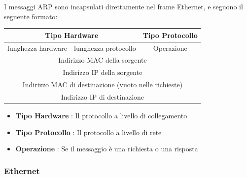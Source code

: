 \documentclass[12pt, letterpaper]{article}
\begin{document}
I messaggi ARP sono incapsulati direttamente nel frame Ethernet, e seguono il seguente formato: \begin{center}
    \begin{tabular}{|ccc|}
        \hline
        \multicolumn{2}{|c|}{Tipo Hardware}                                                  & Tipo Protocollo \\ \hline
        \multicolumn{1}{|c|}{lunghezza hardware} & \multicolumn{1}{c|}{lunghezza protocollo} & Operazione      \\ \hline
        \multicolumn{3}{|c|}{Indirizzo MAC della sorgente}                                                     \\ \hline
        \multicolumn{3}{|c|}{Indirizzo IP della sorgente}                                                      \\ \hline
        \multicolumn{3}{|c|}{Indirizzo MAC di destinazione (vuoto nelle richieste)}                            \\ \hline
        \multicolumn{3}{|c|}{Indirizzo IP di destinazione}                                                     \\ \hline
        \end{tabular}
\end{center}\begin{itemize}
    \item \textbf{Tipo Hardware} : Il protocollo a livello di collegamento
    \item \textbf{Tipo Protocollo} : Il protocollo a livello di rete
    \item \textbf{Operazione} : Se il messaggio è una richiesta o una risposta
\end{itemize}
\subsubsection{Ethernet}
 
\end{document}
